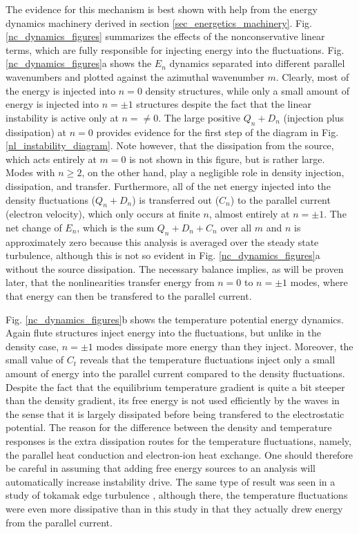 \documentclass[showpacs,preprintnumbers,amsmath,amssymb,superscriptaddress]{revtex4}
\begin{document}
The evidence for this mechanism is best shown with
help from the energy dynamics machinery derived in section \ref{sec_energetics_machinery}. Fig. \ref{nc_dynamics_figures} summarizes the effects of the nonconservative linear terms, which are
fully responsible for injecting energy into the fluctuations. Fig. \ref{nc_dynamics_figures}a shows the $E_n$ dynamics separated into different parallel wavenumbers and plotted
against the azimuthal wavenumber $m$. Clearly, most of the energy is injected into $n=0$ density structures, while only a small amount of energy is injected into
$n= \pm 1$ structures despite the fact that the linear instability is active only at $n= \ne 0$. The large positive $Q_n + D_n$ (injection plus dissipation) at $n=0$ provides evidence for the first
step of the diagram in Fig. \ref{nl_instability_diagram}. Note however, that the dissipation from the source, which acts entirely at $m=0$ is not shown in this figure, but is rather large.
Modes with $n \ge 2$, on the other hand, play a negligible role in density injection, dissipation, and transfer. 
Furthermore, all of the net energy injected into the density fluctuations ($Q_n + D_n$) is transferred out ($C_n$) to
the parallel current (electron velocity), which only occurs at finite $n$, almost entirely at $n = \pm 1$. The net change of $E_n$, which is the sum $Q_n + D_n + C_n$ over all $m$ and $n$
is approximately zero because this analysis is averaged over the steady state turbulence, although this is not so evident in Fig. \ref{nc_dynamics_figures}a without the source dissipation. 
The necessary balance implies, as will be proven later, that the nonlinearities transfer energy from $n=0$ to $n = \pm 1$ modes, where that energy can then
be transfered to the parallel current.

Fig. \ref{nc_dynamics_figures}b shows the temperature potential energy dynamics. Again flute structures inject energy into the fluctuations, but unlike in the density case, $n = \pm 1$ modes
dissipate more energy than they inject. Moreover, the small value of $C_t$ reveals that the temperature fluctuations inject only a small amount of energy into the parallel current compared
to the density fluctuations. Despite the fact that the equilibrium temperature gradient is quite a bit steeper than the density gradient, its free energy is not used efficiently by the waves
in the sense that it is largely dissipated before being transfered to the electrostatic potential. The reason for the difference
between the density and temperature responses is the extra dissipation routes for the temperature fluctuations, namely, the parallel heat conduction and electron-ion heat exchange.
One should therefore be careful in assuming that adding free energy sources to an analysis will automatically increase instability drive.
The same type of result was seen in a study of tokamak edge turbulence \cite{zeiler1997}, although there, the temperature fluctuations were even more dissipative than in this study in that they
actually drew energy from the parallel current. 
\end{document}

